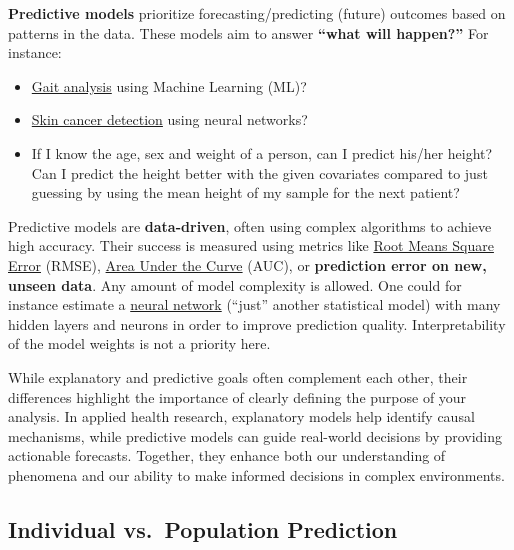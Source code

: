 \documentclass[
]{book}
\providecommand{\tightlist}{%
  \setlength{\itemsep}{0pt}\setlength{\parskip}{0pt}}
\begin{document}
\textbf{Predictive models} prioritize forecasting/predicting (future) outcomes based on patterns in the data.
These models aim to answer \textbf{``what will happen?''} For instance:

\begin{itemize}
\tightlist
\item
  \href{https://www.tandfonline.com/doi/abs/10.1080/03091902.2020.1822940}{Gait analysis} using Machine Learning (ML)?
\item
  \href{https://jamanetwork.com/journals/jamadermatology/fullarticle/2756346}{Skin cancer detection} using neural networks?
\item
  If I know the age, sex and weight of a person, can I predict his/her height?
  Can I predict the height better with the given covariates compared to just
  guessing by using the mean height of my sample for the next patient?
\end{itemize}

Predictive models are \textbf{data-driven}, often using complex algorithms to achieve high accuracy.
Their success is measured using metrics like \href{https://computersciencewiki.org/index.php/Root-mean-square_error_(RMSE)}{Root Means Square Error}
(RMSE), \href{https://en.wikipedia.org/wiki/Receiver_operating_characteristic\#:~:text=The\%20area\%20under\%20the\%20curve,ranks\%20higher\%20than\%20'negative'}{Area Under the Curve}
(AUC), or \textbf{prediction error on new, unseen data}.
Any amount of model complexity is allowed. One could for instance estimate a
\href{https://en.wikipedia.org/wiki/Neural_network_(machine_learning)}{neural network} (``just'' another statistical model)
with many hidden layers and neurons in order to improve prediction quality. Interpretability of the model weights is not a priority here.

While explanatory and predictive goals often complement each other,
their differences highlight the importance of clearly defining the purpose
of your analysis. In applied health research, explanatory models help identify
causal mechanisms, while predictive models can guide real-world decisions by
providing actionable forecasts. Together, they enhance both our understanding
of phenomena and our ability to make informed decisions in complex environments.

\subsection{Individual vs.~Population Prediction}\label{individual-vs.-population-prediction}
\end{document}
